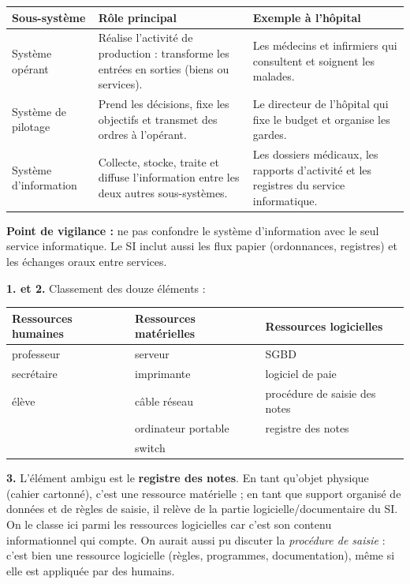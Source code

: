 \documentclass[11pt]{article}
\newcommand{\cle}[1]{{\popxbold\color{popdark}#1}}
\begin{document}
\begin{corrige}
\begin{center}
\begin{tabularx}{\linewidth}{|l|X|X|}
\hline
\rowcolor{popblueL} \textbf{Sous-système} & \textbf{Rôle principal} & \textbf{Exemple à l'hôpital} \\
\hline
\cle{Système opérant} & Réalise l'activité de production : transforme les entrées en sorties (biens ou services). & Les médecins et infirmiers qui consultent et soignent les malades. \\
\hline
\cle{Système de pilotage} & Prend les décisions, fixe les objectifs et transmet des ordres à l'opérant. & Le directeur de l'hôpital qui fixe le budget et organise les gardes. \\
\hline
\cle{Système d'information} & Collecte, stocke, traite et diffuse l'information entre les deux autres sous-systèmes. & Les dossiers médicaux, les rapports d'activité et les registres du service informatique. \\
\hline
\end{tabularx}
\end{center}

\textbf{Point de vigilance :} ne pas confondre le système d'information avec le seul service informatique. Le SI inclut aussi les flux papier (ordonnances, registres) et les échanges oraux entre services.
\end{corrige}

\begin{corrige}
\textbf{1. et 2.} Classement des douze éléments :

\begin{center}
\begin{tabularx}{\linewidth}{|X|X|X|}
\hline
\rowcolor{popblueL} \textbf{Ressources humaines} & \textbf{Ressources matérielles} & \textbf{Ressources logicielles} \\
\hline
professeur & serveur & SGBD \\
\hline
secrétaire & imprimante & logiciel de paie \\
\hline
élève & câble réseau & procédure de saisie des notes \\
\hline
 & ordinateur portable & registre des notes \\
\hline
 & switch & \\
\hline
\end{tabularx}
\end{center}

\textbf{3.} L'élément ambigu est le \textbf{registre des notes}. En tant qu'objet physique (cahier cartonné), c'est une ressource matérielle ; en tant que support organisé de données et de règles de saisie, il relève de la partie logicielle/documentaire du SI. On le classe ici parmi les ressources logicielles car c'est son contenu informationnel qui compte. On aurait aussi pu discuter la \emph{procédure de saisie} : c'est bien une ressource logicielle (règles, programmes, documentation), même si elle est appliquée par des humains.
\end{corrige}
\end{document}
